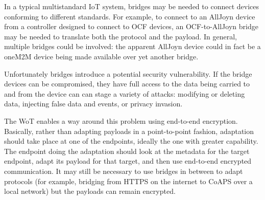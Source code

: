 In a typical multistandard IoT system,
bridges may be needed to connect devices
conforming to different standards.
For example,
to connect to an AllJoyn device from a controller
designed to connect to OCF devices, an OCF-to-AllJoyn bridge
may be needed to translate both the protocol and the payload.
In general, multiple bridges could be involved: the
apparent AllJoyn device could in fact be a oneM2M device
being made available over yet another bridge.

Unfortunately bridges introduce a potential security vulnerability.
If the bridge devices can be compromised,
they have full access to the
data being carried to and from the device can can stage a 
variety of attacks: 
modifying or deleting data,
injecting false data and events,
or privacy invasion.

The WoT enables a way around this problem using end-to-end encryption.
Basically, rather than adapting payloads in a point-to-point fashion,
adaptation should take place at one of the endpoints, ideally the
one with greater capability.  The endpoint doing the adaptation should
look at the metadata for the target endpoint, adapt its payload for that
target, and then use end-to-end encrypted communication.
It may still be necessary to use bridges in between to adapt protocols
(for example, bridging from HTTPS on the internet to CoAPS over a local
network) but the payloads can remain encrypted.

